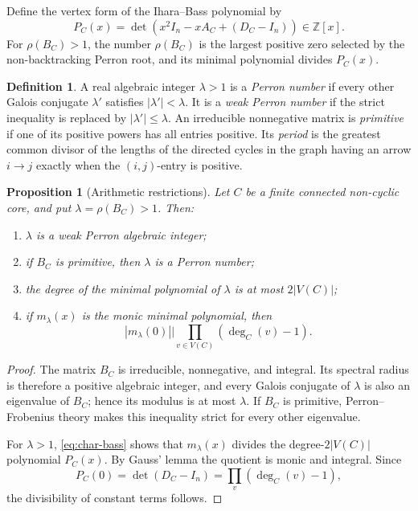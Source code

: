\documentclass[11pt]{amsart}
\theoremstyle{plain}
\newtheorem{proposition}[theorem]{Proposition}
\theoremstyle{definition}
\newtheorem{definition}[theorem]{Definition}
\theoremstyle{remark}
\newcommand{\ZZ}{\mathbb Z}
\begin{document}
Define the vertex form of the Ihara--Bass polynomial by
\begin{equation}\label{eq:PC}
  P_C(x)=\det\!\left(x^2I_n-xA_C+(D_C-I_n)\right)\in\ZZ[x].
\end{equation}
For \(\rho(B_C)>1\), the number \(\rho(B_C)\) is the largest positive zero
selected by the non-backtracking Perron root, and its minimal polynomial
divides \(P_C(x)\).

\begin{definition}
A real algebraic integer \(\lambda>1\) is a \emph{Perron number} if every
other Galois conjugate \(\lambda'\) satisfies
\(|\lambda'|<\lambda\).  It is a \emph{weak Perron number} if the strict
inequality is replaced by \(|\lambda'|\leq\lambda\).
An irreducible nonnegative matrix is \emph{primitive} if one of its positive
powers has all entries positive.  Its \emph{period} is the greatest common
divisor of the lengths of the directed cycles in the graph having an arrow
\(i\to j\) exactly when the \((i,j)\)-entry is positive.
\end{definition}

\begin{proposition}[Arithmetic restrictions]\label{prop:arithmetic}
Let \(C\) be a finite connected non-cyclic core, and put
\(\lambda=\rho(B_C)>1\).  Then:
\begin{enumerate}[label=(\roman*)]
  \item \(\lambda\) is a weak Perron algebraic integer;
  \item if \(B_C\) is primitive, then \(\lambda\) is a Perron number;
  \item the degree of the minimal polynomial of \(\lambda\) is at most
    \(2|V(C)|\);
  \item if \(m_\lambda(x)\) is the monic minimal polynomial, then
    \[
      |m_\lambda(0)|
      \mathrel{\big|}
      \prod_{v\in V(C)}(\deg_C(v)-1).
    \]
\end{enumerate}
\end{proposition}

\begin{proof}
The matrix \(B_C\) is irreducible, nonnegative, and integral.  Its spectral
radius is therefore a positive algebraic integer, and every Galois conjugate
of \(\lambda\) is also an eigenvalue of \(B_C\); hence its modulus is at most
\(\lambda\).  If \(B_C\) is primitive, Perron--Frobenius theory makes this
inequality strict for every other eigenvalue.

For \(\lambda>1\), \eqref{eq:char-bass} shows that
\(m_\lambda(x)\) divides the degree-\(2|V(C)|\) polynomial \(P_C(x)\).  By
Gauss' lemma the quotient is monic and integral.  Since
\[
  P_C(0)=\det(D_C-I_n)=\prod_v(\deg_C(v)-1),
\]
the divisibility of constant terms follows.
\end{proof}
\end{document}
